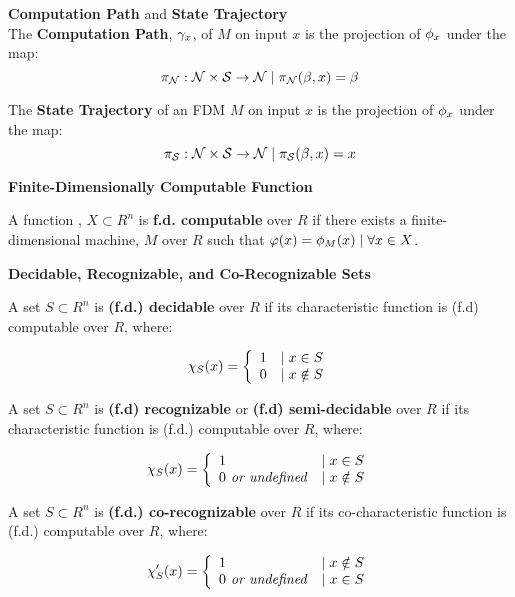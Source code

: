 \begin{definition}{\textbf{Computation Path} and \textbf{State Trajectory}}\\
  
  The \textbf{Computation Path}, $\gamma_x$, of $M$ on
  input $x$ is the projection of $\phi_x$ under the map:
  $$\pi_{\mathcal{N}}:\mathcal{N} \times \mathcal{S} \rightarrow \mathcal{N} \mid \pi_{\mathcal{N}}(\beta, x) = \beta$$
  
  The \textbf{State Trajectory} of an FDM $M$ on input $x$ is the
  projection of $\phi_x$ under the map:
  $$\pi_{\mathcal{S}}:\mathcal{N} \times \mathcal{S} \rightarrow \mathcal{N} \mid \pi_{\mathcal{S}}(\beta, x) = x$$
\end{definition}


\begin{definition}{\textbf{Finite-Dimensionally Computable Function}}
  
  A function , $X \subset R^n$ is
  \textbf{f.d. computable} over $R$ if there exists a
  finite-dimensional machine, $M$ over $R$ such that 
  $\varphi(x) = \phi_M(x) \mid \forall x \in X$.
  
\end{definition}

\begin{definition}{\textbf{Decidable, Recognizable, and Co-Recognizable Sets}}
  
  A set $S \subset R^n$ is \textbf{(f.d.) decidable} over $R$ if its
  characteristic function  is (f.d)
  computable over $R$, where:
  
  $$\chi_S(x) =  \left\{ \begin{array}{ll} 1 & \mid x \in S \\ 0 & \mid x \notin S \end{array} \right.$$
  
  A set $S \subset R^n$ is \textbf{(f.d) recognizable} or
  \textbf{(f.d) semi-decidable} over $R$ if its characteristic
  function  is (f.d.) computable over $R$,
  where:
  
  $$\chi_S(x) =  \left\{ \begin{array}{ll} 1 & \mid x \in S \\ 0 \text{\emph{ or undefined}} & \mid x \notin S \end{array} \right.$$
  
  A set $S \subset R^n$ is \textbf{(f.d.) co-recognizable} over $R$
  if its co-characteristic function  is (f.d.)
  computable over $R$, where:
  
  $$\chi'_S(x) =  \left\{ \begin{array}{ll} 1 & \mid x \notin S \\ 0 \text{\emph{ or undefined}} & \mid x \in S \end{array} \right.$$
  
\end{definition}

